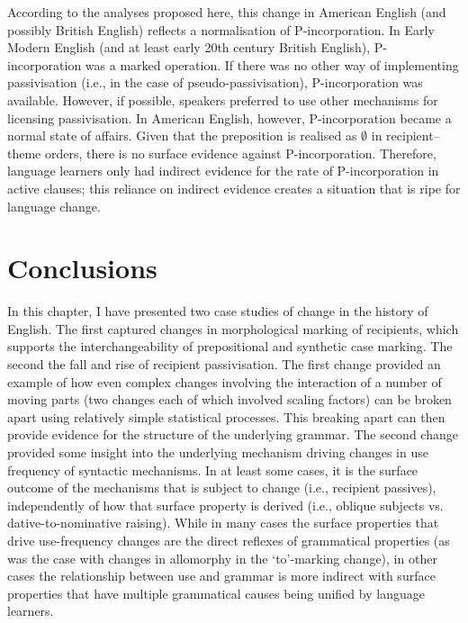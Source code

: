 	According to the analyses proposed here, this change in American English (and possibly British English) reflects a normalisation of P-incorporation. In Early Modern English (and at least early 20th century British English), P-incorporation was a marked operation. If there was no other way of implementing passivisation (i.e., in the case of pseudo-passivisation), P-incorporation was available. However, if possible, speakers preferred to use other mechanisms for licensing passivisation. In American English, however, P-incorporation became a normal state of affairs. Given that the preposition is realised as $\emptyset$ in recipient--theme orders, there is no surface evidence against P-incorporation. Therefore, language learners only had indirect evidence for the rate of P-incorporation in active clauses; this reliance on indirect evidence creates a situation that is ripe for language change.

\section{Conclusions}
	In this chapter, I have presented two case studies of change in the history of English. The first captured changes in morphological marking of recipients, which supports the interchangeability of prepositional and synthetic case marking. The second the fall and rise of recipient passivisation. The first change provided an example of how even complex changes involving the interaction of a number of moving parts (two changes each of which involved scaling factors) can be broken apart using relatively simple statistical processes. This breaking apart can then provide evidence for the structure of the underlying grammar. The second change provided some insight into the underlying mechanism driving changes in use frequency of syntactic mechanisms. In at least some cases, it is the surface outcome of the mechanisms that is subject to change (i.e., recipient passives), independently of how that surface property is derived (i.e., oblique subjects vs. dative-to-nominative raising). While in many cases the surface properties that drive use-frequency changes are the direct reflexes of grammatical properties (as was the case with changes in allomorphy in the `to'-marking change), in other cases the relationship between use and grammar is more indirect with surface properties that have multiple grammatical causes being unified by language learners.

%
